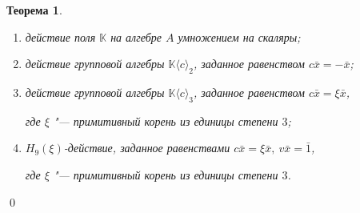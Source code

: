 \documentclass[12pt, reqno, a4paper, oneside, notitlepage]{amsart}
\makeatletter
\theoremstyle{mytheoremstyle}
\newtheorem{theorem}{Теорема}[section]
\theoremstyle{myremarkstyle}
\numberwithin{equation}{section}
\renewenvironment{proof}[1][\proofname]{\par\indent {\bfseries #1\@addpunct{.} }}{\qed}
\makeatother
\begin{document}
\begin{proof}
\begin{theorem}
    \begin{enumerate}
        \item действие поля $\mathbb{K}$ на алгебре $A$ умножением на скаляры; \label{scalar}
        
        \item действие групповой алгебры $\mathbb{K}\langle c\rangle_2$, заданное равенством 
        ${c\bar{x} = -\bar{x}}$; \label{eps=b^2}
        
        \item действие групповой алгебры $\mathbb{K}\langle c \rangle_3$, заданное равенством $c\bar{x} = \xi \bar{x}$,
        
        где $\xi$ "--- примитивный корень из единицы степени $3$;\label{diagonal} 
        
        \item $H_9(\xi)$-действие, заданное равенствами $c\bar{x}=\xi\bar{x},\ v\bar{x}= \bar{1}$, 
        
        где $\xi$ "--- примитивный корень из единицы степени $3$. \label{all}
        
    \end{enumerate}
\end{theorem}



\end{proof}
\end{document}
